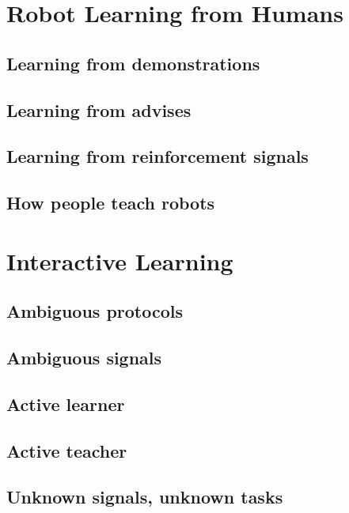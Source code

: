 \section{Robot Learning from Humans}

\subsection{Learning from demonstrations}

\subsection{Learning from advises}

\subsection{Learning from reinforcement signals}

\subsection{How people teach robots}

\section{Interactive Learning}

\subsection{Ambiguous protocols}

\subsection{Ambiguous signals}

\subsection{Active learner}

\subsection{Active teacher}

\subsection{Unknown signals, unknown tasks}

